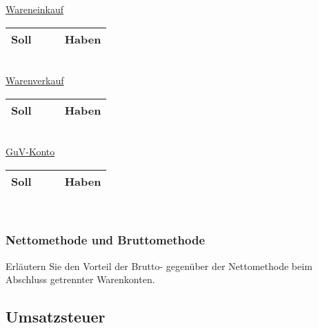 \documentclass[paper=a4, fontsize=11pt]{scrartcl}
\numberwithin{equation}{section}
\numberwithin{figure}{section}
\numberwithin{table}{section}
\begin{document}
\underline{Wareneinkauf}

\begin{tabular}{cc|cc}
\hline
Soll & & & Haben \\
\hline
\end{tabular}
\\

\underline{Warenverkauf}

\begin{tabular}{cc|cc}
\hline
Soll & & & Haben \\
\hline
\end{tabular}
\\

\underline{GuV-Konto}

\begin{tabular}{cc|cc}
\hline
Soll & & & Haben \\
\hline
\end{tabular}
\\

\subsubsection{Nettomethode und Bruttomethode}
Erläutern Sie den Vorteil der Brutto- gegenüber der Nettomethode beim Abschluss getrennter Warenkonten. 
\subsection{Umsatzsteuer}
\end{document}
